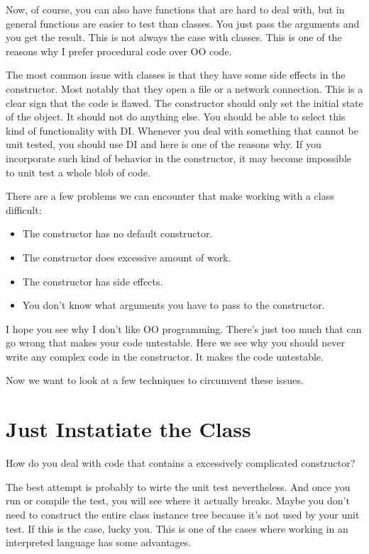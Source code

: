 Now, of course, you can also have functions that are hard to deal with, but in general functions are easier to test than classes. You just pass the arguments and you get the result. This is not always the case with classes. This is one of the reasons why I prefer procedural code over OO code.

The most common issue with classes is that they have some side effects in the constructor. Most notably that they open a file or a network connection. This is a clear sign that the code is flawed. The constructor should only set the initial state of the object. It should not do anything else. You should be able to select this kind of functionality with DI. Whenever you deal with something that cannot be unit tested, you should use DI and here is one of the reasons why. If you incorporate such kind of behavior in the constructor, it may become impossible to unit test a whole blob of code.

There are a few problems we can encounter that make working with a class difficult:
\begin{itemize}
    \item The constructor has no default constructor.
    \item The constructor does excessive amount of work.
    \item The constructor has side effects.
    \item You don't know what arguments you have to pass to the constructor.
\end{itemize}
I hope you see why I don't like OO programming. There's just too much that can go wrong that makes your code untestable. Here we see why you should never write any complex code in the constructor. It makes the code untestable.

Now we want to look at a few techniques to circumvent these issues.

\section{Just Instatiate the Class}

How do you deal with code that contains a excessively complicated constructor?

The best attempt is probably to wirte the unit test nevertheless. And once you run or compile the test, you will see where it actually breaks. Maybe you don't need to construct the entire class instance tree because it's not used by your unit test. If this is the case, lucky you. This is one of the cases where working in an interpreted language has some advantages.

